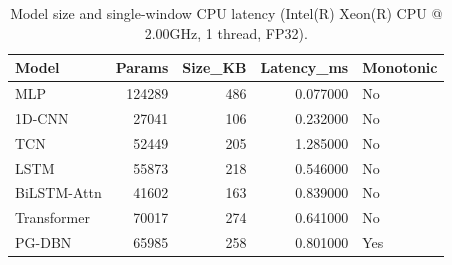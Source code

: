 \begin{table}
\caption{Model size and single-window CPU latency (Intel(R) Xeon(R) CPU @ 2.00GHz, 1 thread, FP32).}
\label{tab:table4_complexity}
\begin{tabular}{lrrrl}
\toprule
Model & Params & Size\_KB & Latency\_ms & Monotonic \\
\midrule
MLP & 124289 & 486 & 0.077000 & No \\
1D-CNN & 27041 & 106 & 0.232000 & No \\
TCN & 52449 & 205 & 1.285000 & No \\
LSTM & 55873 & 218 & 0.546000 & No \\
BiLSTM-Attn & 41602 & 163 & 0.839000 & No \\
Transformer & 70017 & 274 & 0.641000 & No \\
PG-DBN & 65985 & 258 & 0.801000 & Yes \\
\bottomrule
\end{tabular}
\end{table}
